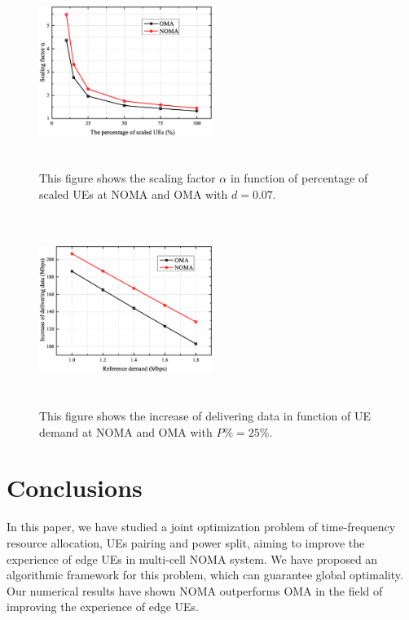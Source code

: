 \documentclass[10pt,journal,final,finalsubmission,twocolumn]{IEEEtran}
\begin{document}
\begin{figure}
\centering
\includegraphics[width=0.5\textwidth, height=6.2cm]{2.eps}
\caption{This figure shows the scaling factor $\alpha$ in function of percentage of scaled UEs at NOMA and OMA with $d=0.07$.}
\label{2}
\end{figure}

\begin{figure}
\centering
\includegraphics[width=0.5\textwidth, height=6.2cm]{3.eps}
\caption{This figure shows the increase of delivering data in function of UE demand at NOMA and OMA with $P\% = 25\%$.}
\label{3}
\end{figure}





\section{Conclusions}\label{Sec:Conclusions}

In this paper, we have studied a joint optimization problem of time-frequency resource allocation, UEs pairing and power split, aiming to improve the experience of edge UEs in multi-cell NOMA system. We have proposed an algorithmic framework for this problem, which can guarantee global optimality. Our numerical results have shown NOMA outperforms OMA in the field of improving the experience of edge UEs. 
\end{document}
